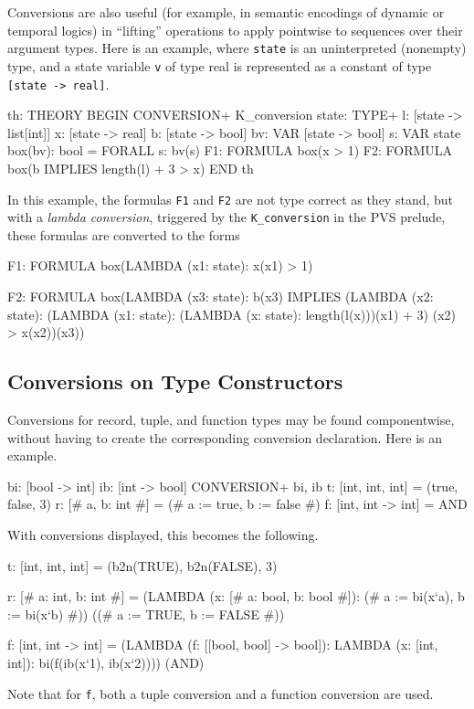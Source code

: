 Conversions are also useful (for example, in semantic encodings of dynamic
or temporal logics) in ``lifting'' operations to apply pointwise to
sequences over their argument types.  Here is an example, where
\texttt{state} is an uninterpreted (nonempty) type, and a state variable
\texttt{v} of type real is represented as a constant of type
\texttt{[state -> real]}.
\begin{session}
  th: THEORY
   BEGIN
    CONVERSION+ K_conversion
    state: TYPE+
    l: [state -> list[int]]
    x: [state -> real]
    b: [state -> bool]
    bv: VAR [state -> bool]
    s: VAR state
    box(bv): bool = FORALL s: bv(s)
    F1: FORMULA box(x > 1)
    F2: FORMULA box(b IMPLIES length(l) + 3 > x)
   END th
\end{session}
In this example, the formulas \texttt{F1} and \texttt{F2} are not type
correct as they stand, but with a \emph{lambda conversion}, triggered by the
\texttt{K\_conversion} in the PVS prelude, these formulas are converted to
the forms
\begin{session}
  F1: FORMULA box(LAMBDA (x1: state): x(x1) > 1)
  
  F2: FORMULA
    box(LAMBDA (x3: state):
          b(x3) IMPLIES
           (LAMBDA (x2: state):
              (LAMBDA (x1: state):
                 (LAMBDA (x: state): length(l(x)))(x1) + 3)
                (x2)
             > x(x2))(x3))
\end{session}

\subsection{Conversions on Type Constructors}\label{type-conversions}

Conversions for record, tuple, and function types may be found
componentwise, without having to create the corresponding conversion
declaration.  Here is an example.
\begin{session}
  bi: [bool -> int]
  ib: [int -> bool]
  CONVERSION+ bi, ib
  t: [int, int, int] = (true, false, 3)
  r: [# a, b: int #] = (# a := true, b := false #)
  f: [int, int -> int] = AND
\end{session}
With conversions displayed, this becomes the following.
\begin{session}
  t: [int, int, int] = (b2n(TRUE), b2n(FALSE), 3)

  r: [# a: int, b: int #] =
      (LAMBDA (x: [# a: bool, b: bool #]): (# a := bi(x`a), b := bi(x`b) #))
          ((# a := TRUE, b := FALSE #))

  f: [int, int -> int] =
      (LAMBDA (f: [[bool, bool] -> bool]):
         LAMBDA (x: [int, int]): bi(f(ib(x`1), ib(x`2))))
          (AND)
\end{session}
Note that for \texttt{f}, both a tuple conversion and a function
conversion are used.


